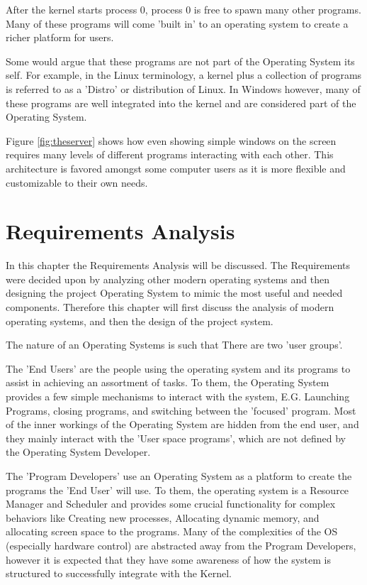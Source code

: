 \documentclass[a4paper]{report}
\begin{document}
After the kernel starts process 0, process 0 is free to spawn many other programs. Many of these programs will come 'built in' to an operating system to create a richer platform for users.

Some would argue that these programs are not part of the Operating System its self. For example, in the Linux terminology, a kernel plus a collection of programs is referred to as a 'Distro' or distribution of Linux. In Windows however, many of these programs are well integrated into the kernel and are considered part of the Operating System.

Figure \ref{fig:theserver} shows how even showing simple windows on the screen requires many levels of different programs interacting with each other. This architecture is favored amongst some computer users as it is more flexible and customizable to their own needs.

\chapter*{Requirements Analysis}

In this chapter the Requirements Analysis will be discussed. The Requirements were decided upon by analyzing other modern operating systems and then designing the project Operating System to mimic the most useful and needed components. Therefore this chapter will first discuss the analysis of modern operating systems, and then the design of the project system.


The nature of an Operating Systems is such that There are two 'user groups'.


The 'End Users' are the people using the operating system and its programs to assist in achieving an assortment of tasks. To them, the Operating System provides a few simple mechanisms to interact with the system, E.G. Launching Programs, closing programs, and switching between the 'focused' program. Most of the inner workings of the Operating System are hidden from the end user, and they mainly interact with the 'User space programs', which are not defined by the Operating System Developer.


The 'Program Developers' use an Operating System as a platform to create the programs the 'End User' will use. To them, the operating system is a Resource Manager and Scheduler and provides some crucial functionality for complex behaviors like Creating new processes, Allocating dynamic memory, and allocating screen space to the programs. Many of the complexities of the OS (especially hardware control) are abstracted away from the Program Developers, however it is expected that they have some awareness of how the system is structured to successfully integrate with the Kernel.
\end{document}
